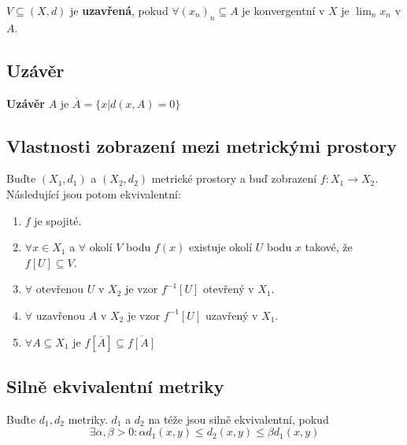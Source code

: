 \documentclass[../main.tex]{subfiles}
\begin{document}
\noindent
\hspace{1.2mm}
$V \subseteq (X,d)$ je \textbf{uzavřená}, pokud $\forall (x_n)_n \subseteq A$ je konvergentní
v $X$ je $\lim_n x_n$ v $A$.

\subsection{Uzávěr}
\hspace{1.2mm}
\textbf{Uzávěr} $A$ je $\overline{A} = \{ x | d(x,A) = 0 \}$

\subsection{Vlastnosti zobrazení mezi metrickými prostory}
\hspace{1.2mm}
Buďte $(X_1, d_1)$ a $(X_2, d_2)$ metrické prostory a buď zobrazení $f: X_1 \to X_2$. Následující
jsou potom ekvivalentní:
\begin{enumerate}
    \item $f$ je spojité.
    \item $\forall x \in X_1$ a $\forall$ okolí $V$ bodu $f(x)$ existuje okolí $U$ bodu $x$ takové, že
        $f[U] \subseteq V$.
    \item $\forall$ otevřenou $U$ v $X_2$ je vzor $f^{-1}[U]$ otevřený v $X_1$.
    \item $\forall$ uzavřenou $A$ v $X_2$ je vzor $f^{-1}[U]$ uzavřený v $X_1$.
    \item $\forall A \subseteq X_1$ je $f[\overline{A}] \subseteq \overline{f[A]}$
\end{enumerate}


\subsection{Silně ekvivalentní metriky}
\hspace{1.2mm}
Buďte $d_1, d_2$ metriky. $d_1$ a $d_2$ na téže jsou silně ekvivalentní, pokud
\[\exists \alpha , \beta > 0: \alpha d_1(x,y) \leq d_2(x,y) \leq \beta d_1(x,y)\]

\end{document}
